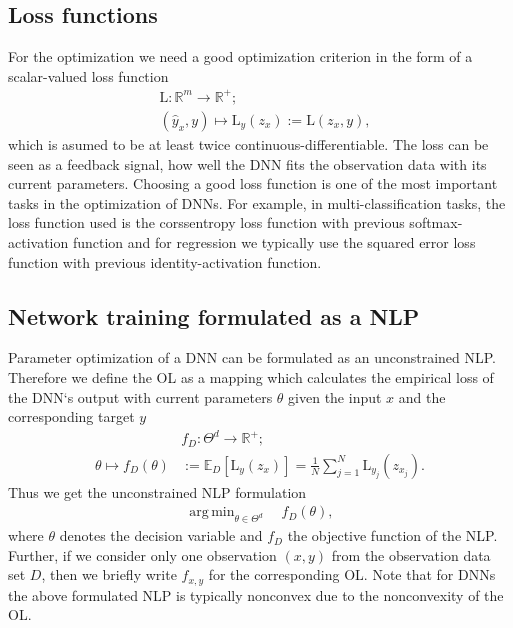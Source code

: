\documentclass[conference]{IEEEtran}
\DeclareMathOperator*{\argmin}{arg\,min}
\begin{document}
\subsection{Loss functions}
For the optimization we need a good optimization criterion in the form of a scalar-valued loss function
\begin{align}
&\mathrm{L}:\mathbb{R}^{m}\rightarrow \mathbb{R}^{+};\\
&(\hat{y}_{x}, y)\mapsto \mathrm{L}_{y}(z_{x}) := \mathrm{L}(z_{x}, y),
\end{align}
which is asumed to be at least twice continuous-differentiable. The loss can be seen as a feedback signal, how well the DNN fits the observation data with its current parameters. Choosing a good loss function is one of the most important tasks in the optimization of DNNs. For example, in multi-classification tasks, the loss function used is the corssentropy loss function with previous softmax-activation function and for regression we typically use the squared error loss function with previous identity-activation function.

\subsection{Network training formulated as a NLP}
Parameter optimization of a DNN can be formulated as an unconstrained NLP. Therefore we define the OL as a mapping which calculates the empirical loss of the DNN`s output with current parameters $\theta$ given the input $x$ and the corresponding target $y$
\begin{align}
&f_{D}:\Theta^{d}\rightarrow\mathbb{R}^{+};\\
\theta\mapsto f_{D}(\theta) &:= \mathbb{E}_{D}[\mathrm{L}_{y}(z_{x})] =  \frac{1}{N}\sum_{j = 1}^{N}\mathrm{L}_{y_{j}}(z_{x_{j}}).
\end{align}
Thus we get the unconstrained NLP formulation
\begin{align}
\argmin_{\theta\in\Theta^{d}}\quad f_{D}(\theta),
\end{align}
where $\theta$ denotes the decision variable and $f_{D}$ the objective function of the NLP.
Further, if we consider only one observation $(x, y)$ from the observation data set $D$, then we briefly write  $f_{x, y}$ for the corresponding OL. Note that for DNNs the above formulated NLP is typically nonconvex due to the nonconvexity of the OL.
\end{document}
